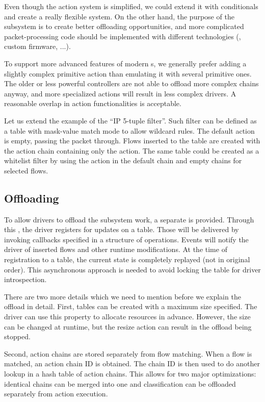 Even though the action system is simplified, we could extend it with
conditionals and create a really flexible system. On the other hand, the
purpose of the subsystem is to create better offloading opportunities, and more
complicated packet-processing code should be implemented with different
technologies (, custom firmware, ...).

To support more advanced features of modern s, we generally prefer adding
a slightly complex primitive action than emulating it with several primitive ones.
The older or less powerful controllers are not able to offload more complex chains
anyway, and more specialized actions will result in less complex drivers.
A reasonable overlap in action functionalities is acceptable.

Let us extend the example of the ``IP 5-tuple filter''. Such filter can be defined
as a table with mask-value match mode to allow wildcard rules. The default
action is empty, passing the packet through. Flows inserted to the table
are created with the action chain containing only the  action.
The same table could be created as a whitelist filter by using the 
action in the default chain and empty chains for selected flows.

\subsection{Offloading}

To allow  drivers to offload the subsystem work, a separate  is
provided. Through this , the driver registers for updates on a table.
Those will be delivered by invoking callbacks specified in a structure of
operations. Events will notify the driver of inserted flows and other
runtime modifications. At the time of registration to a table, the current
state is completely replayed (not in original order). This asynchronous
approach is needed to avoid locking the table for driver introspection.

There are two more details which we need to mention before we explain the
offload in detail. First, tables can be created with a maximum size specified. The
driver can use this property to allocate resources in advance. However, the
size can be changed at runtime, but the resize action can result in the offload
being stopped.

Second, action chains are stored separately from flow matching. When
a flow is matched, an action chain ID is obtained. The chain ID is then used to
do another lookup in a hash table of action chains. This allows for two major
optimizations: identical chains can be merged into one and classification can
be offloaded separately from action execution.

